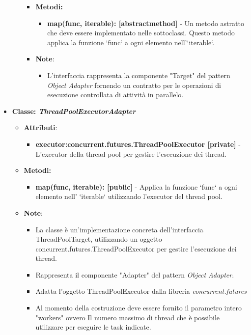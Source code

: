 \begin{itemize}
\begin{itemize}
    \begin{itemize}
    \item\textbf{Metodi: }
    \begin{itemize}
        \item \textbf{map(func, iterable): [abstractmethod]} - Un metodo astratto che deve essere implementato nelle sottoclassi. Questo metodo applica la funzione `func` a ogni elemento nell'`iterable`.
    \end{itemize}
    \item\textbf{Note}:
        \begin{itemize}
            \item L'interfaccia rappresenta la componente "Target" del pattern \textit{Object Adapter} fornendo un contratto per le operazioni di esecuzione controllata di attività in parallelo.
         \end{itemize}
    \end{itemize}
    \end{itemize}
    \item{\textbf{Classe: \textit{ThreadPoolExecutorAdapter}}}
    \begin{itemize}
    \item\textbf{Attributi}:
        \begin{itemize}
        \item \textbf{executor:concurrent.futures.ThreadPoolExecutor [private]} - L'executor della thread pool per gestire l'esecuzione dei thread.
    \end{itemize}
    \item \textbf{Metodi: }
    \begin{itemize}
        \item \textbf{map(func, iterable): [public]} - Applica la funzione `func` a ogni elemento nell' `iterable` utilizzando l'executor del thread pool.
    \end{itemize}
    \item\textbf{Note}:
        \begin{itemize}
            \item La classe è un'implementazione concreta dell'interfaccia ThreadPoolTarget, utilizzando un oggetto concurrent.futures.ThreadPoolExecutor per gestire l'esecuzione dei thread.
            \item Rappresenta il componente "Adapter" del pattern \textit{Object Adapter}.
            \item Adatta l'oggetto ThreadPoolExecutor dalla libreria \textit{concurrent.futures}
            \item Al momento della costruzione deve essere fornito il parametro intero "workers" ovvero
            Il numero massimo di thread che è possibile utilizzare per eseguire le task indicate.
        \end{itemize}
    \end{itemize}




\end{itemize}


